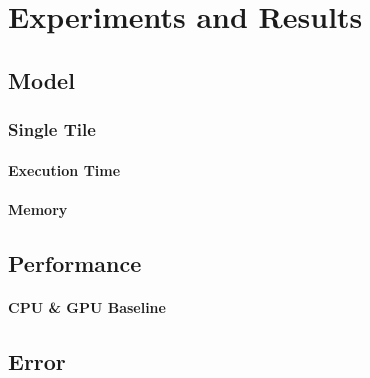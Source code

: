 \chapter{Experiments and Results}\label{chapter:measurements}
\section{Model}
\subsection{Single Tile}
    \subsubsection{Execution Time}
    \subsubsection{Memory}
\section{Performance}
\subsubsection{CPU \& GPU Baseline}
\section{Error}

